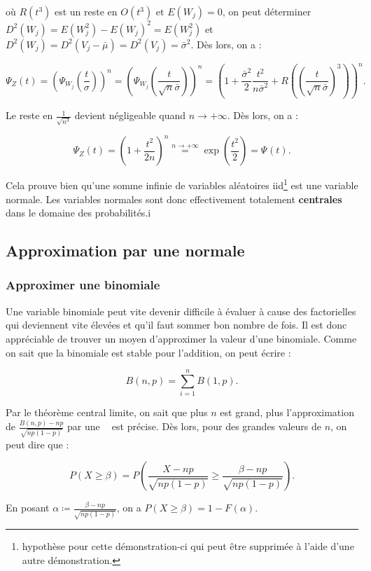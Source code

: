 \documentclass{article}
\DeclareMathOperator{\Nzo}{\mathcal N(0, 1)}
\begin{document}
		où $R(t^3)$ est un reste en $O(t^3)$ et $E(W_j) = 0$, on peut déterminer $D^2(W_j) = E(W_j^2) - E(W_j)^2 = E(W_j^2)$ et $D^2(W_j) = D^2(V_j - \bar\mu) = D^2(V_j) = \bar{\sigma}^2$.
		Dès lors, on a :

		\[\Psi_Z(t) = \left(\Psi_{W_j}\left(\frac t\sigma\right)\right)^n = \left(\Psi_{W_j}\left(\frac t{\sqrt n\bar\sigma}\right)\right)^n = \left( 1 + \frac {\bar{\sigma}^2}2\frac {t^2}{n\bar{\sigma}^2} + R\left(\left(\frac t{\sqrt n\bar\sigma}\right)^3\right)\right)^n.\]

		Le reste en $\frac 1{\sqrt {n^3}}$ devient négligeable quand $n \to +\infty$. Dès lors, on a :

		\[\Psi_Z(t) = \left(1 + \frac {t^2}{2n}\right)^n \stackrel{n\to+\infty}=\exp\left(\frac {t^2}2\right) = \Psi_{\Nzo}(t).\]

		Cela prouve bien qu'une somme infinie de variables aléatoires iid\footnote{hypothèse pour cette démonstration-ci qui peut être supprimée à l'aide d'une autre démonstration.} est une
		variable normale. Les variables normales sont donc effectivement totalement \textbf{centrales} dans le domaine des probabilités.i

	\subsection{Approximation par une normale}
		\subsubsection{Approximer une binomiale}
			Une variable binomiale peut vite devenir difficile à évaluer à cause des factorielles qui deviennent vite élevées et qu'il faut sommer bon nombre de fois. Il est donc appréciable de
			trouver un moyen d'approximer la valeur d'une binomiale. Comme on sait que la binomiale est stable pour l'addition, on peut écrire :

			\[B(n, p) = \sum_{i=1}^nB(1, p).\]

			Par le théorème central limite, on sait que plus $n$ est grand, plus l'approximation de $\frac {B(n, p)-np}{\sqrt {np(1-p)}}$ par une $\Nzo$ est précise. Dès lors,
			pour des grandes valeurs de $n$, on peut dire que :

			\[P(X \geq \beta) = P\left(\frac {X-np}{\sqrt {np(1-p)}} \geq \frac {\beta - np}{\sqrt {np(1-p)}}\right).\]

			En posant $\alpha \coloneqq \frac {\beta - np}{\sqrt {np(1-p)}}$, on a $P(X \geq \beta) = 1 - F_{\Nzo}(\alpha)$.
\end{document}
